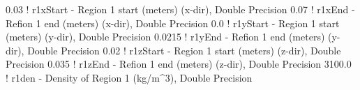 0.03         ! r1xStart - Region 1 start (meters) (x-dir), Double Precision
0.07         ! r1xEnd - Refion 1 end (meters) (x-dir), Double Precision
0.0         ! r1yStart - Region 1 start (meters) (y-dir), Double Precision
0.0215         ! r1yEnd - Refion 1 end (meters) (y-dir), Double Precision
0.02         ! r1zStart - Region 1 start (meters) (z-dir), Double Precision
0.035      ! r1zEnd - Refion 1 end (meters) (z-dir), Double Precision
3100.0      ! r1den - Density of Region 1 (kg/m^3), Double Precision
